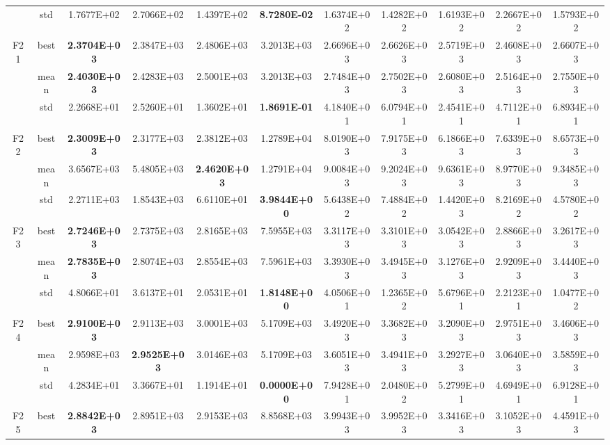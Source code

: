 \documentclass{wzuthesis}
\begin{document}
\begin{longtable}{ccccccccccc}
          & std   & 1.7677E+02 & 2.7066E+02 & 1.4397E+02 & \textbf{8.7280E-02} & 1.6374E+02 & 1.4282E+02 & 1.6193E+02 & 2.2667E+02 & 1.5793E+02 \\
    \multirow{3}[0]{*}{F21} & best  & \textbf{2.3704E+03} & 2.3847E+03 & 2.4806E+03 & 3.2013E+03 & 2.6696E+03 & 2.6626E+03 & 2.5719E+03 & 2.4608E+03 & 2.6607E+03 \\
          & mean  & \textbf{2.4030E+03} & 2.4283E+03 & 2.5001E+03 & 3.2013E+03 & 2.7484E+03 & 2.7502E+03 & 2.6080E+03 & 2.5164E+03 & 2.7550E+03 \\
          & std   & 2.2668E+01 & 2.5260E+01 & 1.3602E+01 & \textbf{1.8691E-01} & 4.1840E+01 & 6.0794E+01 & 2.4541E+01 & 4.7112E+01 & 6.8934E+01 \\
    \multirow{3}[0]{*}{F22} & best  & \textbf{2.3009E+03} & 2.3177E+03 & 2.3812E+03 & 1.2789E+04 & 8.0190E+03 & 7.9175E+03 & 6.1866E+03 & 7.6339E+03 & 8.6573E+03 \\
          & mean  & 3.6567E+03 & 5.4805E+03 & \textbf{2.4620E+03} & 1.2791E+04 & 9.0084E+03 & 9.2024E+03 & 9.6361E+03 & 8.9770E+03 & 9.3485E+03 \\
          & std   & 2.2711E+03 & 1.8543E+03 & 6.6110E+01 & \textbf{3.9844E+00} & 5.6438E+02 & 7.4884E+02 & 1.4420E+03 & 8.2169E+02 & 4.5780E+02 \\
    \multirow{3}[0]{*}{F23} & best  & \textbf{2.7246E+03} & 2.7375E+03 & 2.8165E+03 & 7.5955E+03 & 3.3117E+03 & 3.3101E+03 & 3.0542E+03 & 2.8866E+03 & 3.2617E+03 \\
          & mean  & \textbf{2.7835E+03} & 2.8074E+03 & 2.8554E+03 & 7.5961E+03 & 3.3930E+03 & 3.4945E+03 & 3.1276E+03 & 2.9209E+03 & 3.4440E+03 \\
          & std   & 4.8066E+01 & 3.6137E+01 & 2.0531E+01 & \textbf{1.8148E+00} & 4.0506E+01 & 1.2365E+02 & 5.6796E+01 & 2.2123E+01 & 1.0477E+02 \\
    \multirow{3}[0]{*}{F24} & best  & \textbf{2.9100E+03} & 2.9113E+03 & 3.0001E+03 & 5.1709E+03 & 3.4920E+03 & 3.3682E+03 & 3.2090E+03 & 2.9751E+03 & 3.4606E+03 \\
          & mean  & 2.9598E+03 & \textbf{2.9525E+03} & 3.0146E+03 & 5.1709E+03 & 3.6051E+03 & 3.4941E+03 & 3.2927E+03 & 3.0640E+03 & 3.5859E+03 \\
          & std   & 4.2834E+01 & 3.3667E+01 & 1.1914E+01 & \textbf{0.0000E+00} & 7.9428E+01 & 2.0480E+02 & 5.2799E+01 & 4.6949E+01 & 6.9128E+01 \\
    \multirow{3}[0]{*}{F25} & best  & \textbf{2.8842E+03} & 2.8951E+03 & 2.9153E+03 & 8.8568E+03 & 3.9943E+03 & 3.9952E+03 & 3.3416E+03 & 3.1052E+03 & 4.4591E+03 \\

\end{longtable}
\end{document}
